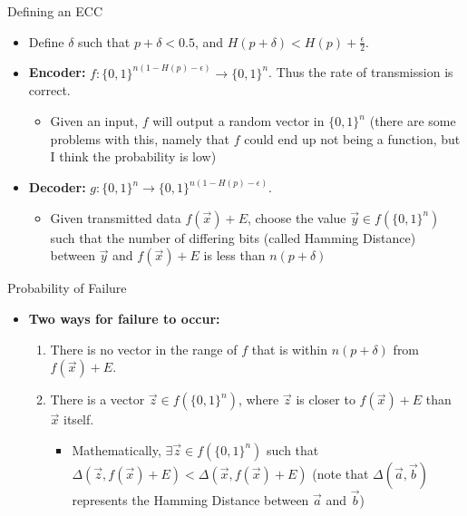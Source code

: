 \documentclass[aspectratio=169]{beamer}
\begin{document}
    \begin{frame}{Defining an ECC}
          \begin{itemize}
                \item Define $\delta$ such that $p + \delta < 0.5$, and $H(p + \delta)< H(p) + \frac{\epsilon}{2}$.
                \item \textbf{Encoder:} $f: \{0, 1\}^{n(1-H(p)-\epsilon)} \to \{0, 1\}^{n}$. Thus the rate of transmission is correct.
                  \begin{itemize}
                \item Given an input, $f$ will output a random vector in $\{0, 1\}^{n}$ (there are some problems with this, namely that $f$ could end up not being a function, but I think the probability is low)
                          \end{itemize}
                \item \textbf{Decoder:} $g: \{0, 1\}^{n} \to \{0, 1\}^{n(1-H(p)-\epsilon)}$.
                  \begin{itemize}
                      \item Given transmitted data $f(\vec{x}) + E$, choose the value $\vec{y} \in f(\{0, 1\}^{n})$ such that the number of differing bits (called Hamming Distance) between $\vec{y}$ and $f(\vec{x}) + E$ is less than $n(p + \delta)$
                          \end{itemize}
              \end{itemize}
      \end{frame}

    \begin{frame}{Probability of Failure}
        \begin{itemize}
                \item \textbf{Two ways for failure to occur:}
                \begin{enumerate}
                        \item There is no vector in the range of $f$ that is within $n(p + \delta)$ from $f(\vec{x}) + E$.
                        \item There is a vector $\vec{z} \in f(\{0, 1\}^{n})$, where $\vec{z}$ is closer to $f(\vec{x}) + E$ than $\vec{x}$ itself.
                        \begin{itemize}
                                \item Mathematically, $\exists \vec{z} \in f(\{0, 1\}^{n})$ such that $\Delta(\vec{z}, f(\vec{x}) + E) < \Delta(\vec{x}, f(\vec{x}) + E)$ (note that $\Delta(\vec{a}, \vec{b})$ represents the Hamming Distance between $\vec{a}$ and $\vec{b}$)
                                \end{itemize}
                        \end{enumerate}
          \end{itemize}
      \end{frame}
\end{document}
